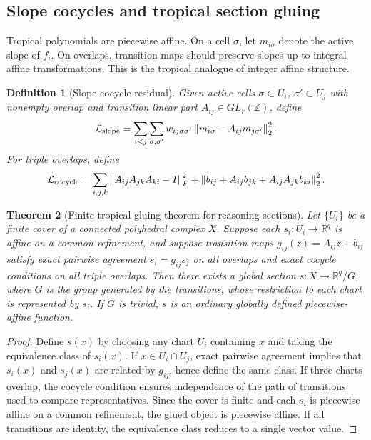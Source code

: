 \documentclass[11pt]{article}
\newtheorem{definition}{Definition}[section]
\newtheorem{theorem}[definition]{Theorem}
\newcommand{\R}{\mathbb{R}}
\newcommand{\Z}{\mathbb{Z}}
\newcommand{\calL}{\mathcal{L}}
\newcommand{\norm}[1]{\left\lVert #1\right\rVert}
\begin{document}
\subsection{Slope cocycles and tropical section gluing}

Tropical polynomials are piecewise affine.  On a cell \(\sigma\), let \(m_{i\sigma}\) denote the active slope of \(f_i\).  On overlaps, transition maps should preserve slopes up to integral affine transformations.  This is the tropical analogue of integer affine structure.

\begin{definition}[Slope cocycle residual]
Given active cells \(\sigma\subset U_i\), \(\sigma'\subset U_j\) with nonempty overlap and transition linear part \(A_{ij}\in GL_r(\Z)\), define
\begin{equation}
\calL_{\rm slope}=\sum_{i<j}\sum_{\sigma,\sigma'} w_{ij\sigma\sigma'}\norm{m_{i\sigma}-A_{ij}m_{j\sigma'}}_2^2.
\end{equation}
For triple overlaps, define
\begin{equation}
\calL_{\rm cocycle}=\sum_{i,j,k}\norm{A_{ij}A_{jk}A_{ki}-I}_F^2+\norm{b_{ij}+A_{ij}b_{jk}+A_{ij}A_{jk}b_{ki}}_2^2.
\end{equation}
\end{definition}

\begin{theorem}[Finite tropical gluing theorem for reasoning sections]
Let \(\{U_i\}\) be a finite cover of a connected polyhedral complex \(X\).  Suppose each \(s_i:U_i\to\R^q\) is affine on a common refinement, and suppose transition maps \(g_{ij}(z)=A_{ij}z+b_{ij}\) satisfy exact pairwise agreement \(s_i=g_{ij}s_j\) on all overlaps and exact cocycle conditions on all triple overlaps.  Then there exists a global section \(s:X\to\R^q/G\), where \(G\) is the group generated by the transitions, whose restriction to each chart is represented by \(s_i\).  If \(G\) is trivial, \(s\) is an ordinary globally defined piecewise-affine function.
\end{theorem}

\begin{proof}
Define \(s(x)\) by choosing any chart \(U_i\) containing \(x\) and taking the equivalence class of \(s_i(x)\).  If \(x\in U_i\cap U_j\), exact pairwise agreement implies that \(s_i(x)\) and \(s_j(x)\) are related by \(g_{ij}\), hence define the same class.  If three charts overlap, the cocycle condition ensures independence of the path of transitions used to compare representatives.  Since the cover is finite and each \(s_i\) is piecewise affine on a common refinement, the glued object is piecewise affine.  If all transitions are identity, the equivalence class reduces to a single vector value.
\end{proof}
\end{document}
